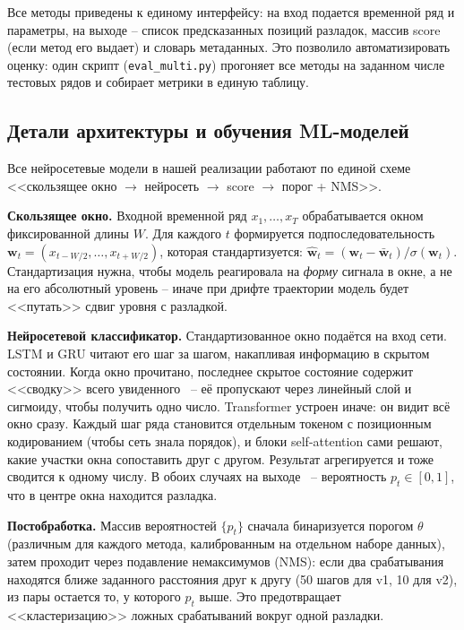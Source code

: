 \documentclass[12pt,a4paper]{article}
\begin{document}
Все методы приведены к единому интерфейсу: на вход подается временной ряд и параметры, на выходе  -- список предсказанных позиций разладок, массив score (если метод его выдает) и словарь метаданных. Это позволило автоматизировать оценку: один скрипт (\texttt{eval\_multi.py}) прогоняет все методы на заданном числе тестовых рядов и собирает метрики в единую таблицу.

\subsection{Детали архитектуры и обучения ML-моделей}

Все нейросетевые модели в нашей реализации работают по единой схеме <<скользящее окно $\to$ нейросеть $\to$ score $\to$ порог + NMS>>.

\textbf{Скользящее окно.} Входной временной ряд $x_1, \ldots, x_T$ обрабатывается окном фиксированной длины $W$. Для каждого $t$ формируется подпоследовательность $\mathbf{w}_t = (x_{t-W/2}, \ldots, x_{t+W/2})$, которая стандартизуется: $\hat{\mathbf{w}}_t = (\mathbf{w}_t - \bar{\mathbf{w}}_t) / \sigma(\mathbf{w}_t)$. Стандартизация нужна, чтобы модель реагировала на \textit{форму} сигнала в окне, а не на его абсолютный уровень  -- иначе при дрифте траектории модель будет <<путать>> сдвиг уровня с разладкой.

\textbf{Нейросетевой классификатор.} Стандартизованное окно подаётся на вход сети. LSTM и GRU читают его шаг за шагом, накапливая информацию в скрытом состоянии. Когда окно прочитано, последнее скрытое состояние содержит <<сводку>> всего увиденного~ -- её пропускают через линейный слой и сигмоиду, чтобы получить одно число. Transformer устроен иначе: он видит всё окно сразу. Каждый шаг ряда становится отдельным токеном с позиционным кодированием (чтобы сеть знала порядок), и блоки self-attention сами решают, какие участки окна сопоставить друг с другом. Результат агрегируется и тоже сводится к одному числу. В обоих случаях на выходе~ -- вероятность $p_t \in [0, 1]$, что в центре окна находится разладка.

\textbf{Постобработка.} Массив вероятностей $\{p_t\}$ сначала бинаризуется порогом $\theta$ (различным для каждого метода, калиброванным на отдельном наборе данных), затем проходит через подавление немаксимумов (NMS): если два срабатывания находятся ближе заданного расстояния друг к другу (50 шагов для v1, 10 для v2), из пары остается то, у которого $p_t$ выше. Это предотвращает <<кластеризацию>> ложных срабатываний вокруг одной разладки.
\end{document}
